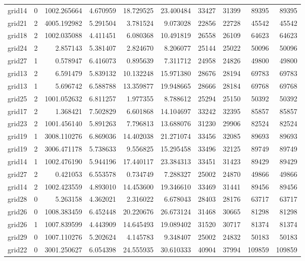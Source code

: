 \begin{longtable}{|l|r|r|r|r|r|r|r|r|r|}
grid14 & 0 & 1002.265664 & 4.670959 & 18.729525 & 23.400484 & 33427 & 31399 & 89395 & 89395 \\
grid21 & 2 & 4005.192982 & 5.291504 & 3.781524 & 9.073028 & 22856 & 22728 & 45542 & 45542 \\
grid18 & 2 & 1002.035088 & 4.411451 & 6.080368 & 10.491819 & 26558 & 26109 & 64623 & 64623 \\
grid24 & 2 & 2.857143 & 5.381407 & 2.824670 & 8.206077 & 25144 & 25022 & 50096 & 50096 \\
grid27 & 1 & 0.578947 & 6.416073 & 0.895639 & 7.311712 & 24958 & 24826 & 49800 & 49800 \\
grid13 & 2 & 6.591479 & 5.839132 & 10.132248 & 15.971380 & 28676 & 28194 & 69783 & 69783 \\
grid13 & 1 & 5.696742 & 6.588788 & 13.359877 & 19.948665 & 28666 & 28184 & 69768 & 69768 \\
grid25 & 2 & 1001.052632 & 6.811257 & 1.977355 & 8.788612 & 25294 & 25150 & 50392 & 50392 \\
grid17 & 2 & 1.368421 & 7.502829 & 6.601868 & 14.104697 & 33242 & 32395 & 85857 & 85857 \\
grid23 & 2 & 1001.456140 & 5.891263 & 7.796813 & 13.688076 & 31230 & 29906 & 82524 & 82524 \\
grid19 & 1 & 3008.110276 & 6.869036 & 14.402038 & 21.271074 & 33456 & 32085 & 89693 & 89693 \\
grid19 & 2 & 3006.471178 & 5.738633 & 9.556825 & 15.295458 & 33496 & 32125 & 89749 & 89749 \\
grid14 & 1 & 1002.476190 & 5.944196 & 17.440117 & 23.384313 & 33451 & 31423 & 89429 & 89429 \\
grid27 & 2 & 0.421053 & 6.553578 & 0.734749 & 7.288327 & 25002 & 24870 & 49866 & 49866 \\
grid14 & 2 & 1002.423559 & 4.893010 & 14.453600 & 19.346610 & 33469 & 31441 & 89456 & 89456 \\
grid28 & 0 & 5.263158 & 4.362021 & 2.316022 & 6.678043 & 28403 & 28176 & 63717 & 63717 \\
grid26 & 0 & 1008.383459 & 6.452448 & 20.220676 & 26.673124 & 31468 & 30665 & 81298 & 81298 \\
grid26 & 1 & 1007.839599 & 4.443909 & 14.645493 & 19.089402 & 31520 & 30717 & 81374 & 81374 \\
grid29 & 0 & 1007.110276 & 5.202624 & 4.145783 & 9.348407 & 25002 & 24832 & 50183 & 50183 \\
grid22 & 0 & 3001.250627 & 6.054398 & 24.555935 & 30.610333 & 40904 & 37994 & 109859 & 109859 \\

\end{longtable}
